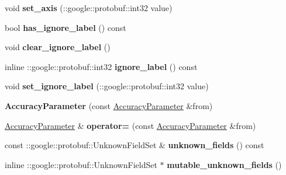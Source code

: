 \begin{DoxyCompactItemize}
void {\bfseries set\+\_\+axis} (\+::google\+::protobuf\+::int32 value)
\item 
\mbox{\label{classcaffe_1_1_accuracy_parameter_a9eaf83ec6f7c896ca6c3c1635bce2a9c}} 
bool {\bfseries has\+\_\+ignore\+\_\+label} () const
\item 
\mbox{\label{classcaffe_1_1_accuracy_parameter_a8a65d59e56d203eaa0f9eca95a6e6047}} 
void {\bfseries clear\+\_\+ignore\+\_\+label} ()
\item 
\mbox{\label{classcaffe_1_1_accuracy_parameter_a019b3dd490b4a03b930a997de40b2ab7}} 
inline \+::google\+::protobuf\+::int32 {\bfseries ignore\+\_\+label} () const
\item 
\mbox{\label{classcaffe_1_1_accuracy_parameter_ad717ca695cbf95e5a41787a14a4b5377}} 
void {\bfseries set\+\_\+ignore\+\_\+label} (\+::google\+::protobuf\+::int32 value)
\item 
\mbox{\label{classcaffe_1_1_accuracy_parameter_a48beee3ea0844f7b3de5691fdd5bcba5}} 
{\bfseries Accuracy\+Parameter} (const \mbox{\hyperlink{classcaffe_1_1_accuracy_parameter}{Accuracy\+Parameter}} \&from)
\item 
\mbox{\label{classcaffe_1_1_accuracy_parameter_abf1de9917962ffdec97ffdfa728ad31e}} 
\mbox{\hyperlink{classcaffe_1_1_accuracy_parameter}{Accuracy\+Parameter}} \& {\bfseries operator=} (const \mbox{\hyperlink{classcaffe_1_1_accuracy_parameter}{Accuracy\+Parameter}} \&from)
\item 
\mbox{\label{classcaffe_1_1_accuracy_parameter_a7d56021534e1a95134749e993e854776}} 
const \+::google\+::protobuf\+::\+Unknown\+Field\+Set \& {\bfseries unknown\+\_\+fields} () const
\item 
\mbox{\label{classcaffe_1_1_accuracy_parameter_a21fb04e8e6029a2ea0563c53b7b22467}} 
inline \+::google\+::protobuf\+::\+Unknown\+Field\+Set $\ast$ {\bfseries mutable\+\_\+unknown\+\_\+fields} ()
\item 
\mbox{\label{classcaffe_1_1_accuracy_parameter_a7f28ff8d7ad5eeaa5dd3473f6a38b4be}} 

\end{DoxyCompactItemize}
